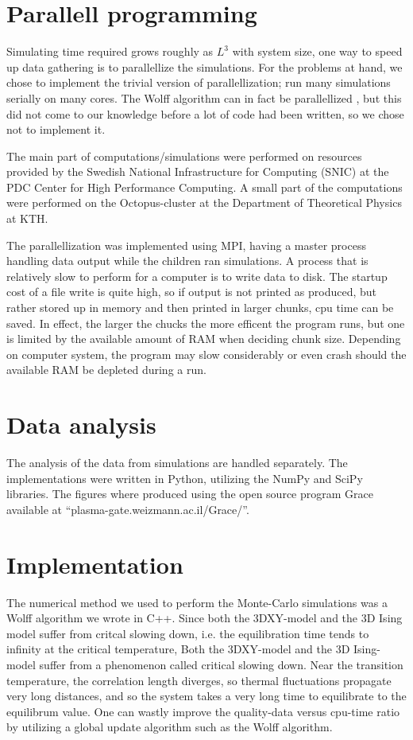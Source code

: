 \section{Parallell programming}
Simulating time required grows roughly as $L^3$ with system size, one way to speed up data gathering is to parallellize the simulations.
For the problems at hand, we chose to implement the trivial version of parallellization; run many simulations serially on many cores.
The Wolff algorithm can in fact be parallellized \cite{Kaupuzs2010}, but this did not come to our knowledge before a lot of code had been written, so we chose not to implement it. 

The main part of computations/simulations were performed on resources provided by the Swedish National Infrastructure for Computing (SNIC) at the PDC Center for High Performance Computing.
A small part of the computations were performed on the Octopus-cluster at the Department of Theoretical Physics at KTH.

The parallellization was implemented using MPI, having a master process handling data output while the children ran simulations.
A process that is relatively slow to perform for a computer is to write data to disk. 
The startup cost of a file write is quite high, so if output is not printed as produced, but rather stored up in memory and then printed in larger chunks, cpu time can be saved. 
In effect, the larger the chucks the more efficent the program runs, but one is limited by the available amount of RAM when deciding chunk size.
Depending on computer system, the program may slow considerably or even crash should the available RAM be depleted during a run.
\section{Data analysis}
The analysis of the data from simulations are handled separately.
The implementations were written in Python, utilizing the NumPy and SciPy libraries. 
The figures where produced using the open source program Grace available at ``plasma-gate.weizmann.ac.il/Grace/''.

\section{Implementation}
The numerical method we used to perform the Monte-Carlo simulations was a Wolff algorithm we wrote in C++. Since both the 3DXY-model and the 3D Ising model suffer from critcal slowing down, i.e. the equilibration time tends to infinity at the critical temperature, 
Both the 3DXY-model and the 3D Ising-model suffer from a phenomenon called critical slowing down. Near the transition temperature, the correlation length diverges, so thermal fluctuations propagate very long distances, and so the system takes a very long time to equilibrate to the equilibrum value.
One can wastly improve the quality-data versus cpu-time ratio by utilizing a global update algorithm such as the Wolff algorithm. 
